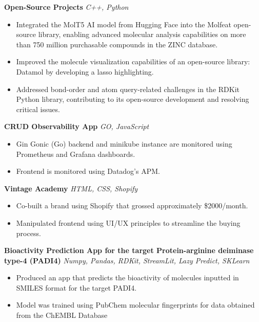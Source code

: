 \documentclass[a4paper]{article}
\begin{document}
{\textbf{Open-Source Projects}} {\sl C++, Python}\\
\vspace{-1mm}
\begin{itemize} \itemsep 1pt
	\item Integrated the MolT5 AI model from Hugging Face into the Molfeat open-source library, enabling advanced molecular analysis capabilities on more than 750 million purchasable compounds in the ZINC database.
	\item Improved the molecule visualization capabilities of an open-source library: Datamol by developing a lasso highlighting. 
        \item Addressed bond-order and atom query-related challenges in the RDKit Python library, contributing to its open-source development and resolving critical issues.\\
\end{itemize}
{\textbf{CRUD Observability App}} {\sl GO, JavaScript}\\
\vspace{-1mm}
\begin{itemize} \itemsep 1pt
	\item Gin Gonic (Go) backend and minikube instance are monitored using Prometheus and Grafana dashboards.
	\item Frontend is monitored using Datadog's APM.
\end{itemize}

{\textbf{Vintage Academy}} {\sl HTML, CSS, Shopify} \\
\vspace{-1mm}
\begin{itemize} \itemsep 1pt
	\item Co-built a brand using Shopify that grossed approximately      \$2000/month.
	\item Manipulated frontend using UI/UX principles to streamline the buying process.\\
\end{itemize}
\vspace*{1mm}

{\textbf{Bioactivity Prediction App for the target Protein-arginine deiminase type-4 (PADI4)}} {\sl Numpy, Pandas, RDKit, StreamLit, Lazy Predict, SKLearn} \\
\vspace{-1mm}
\begin{itemize} \itemsep 1pt
	\item Produced an app that predicts the bioactivity of molecules inputted in SMILES format for the target PADI4.
	\item Model was trained using PubChem molecular fingerprints for data obtained from the ChEMBL Database
\end{itemize}
\vspace*{1mm}
\end{document}
